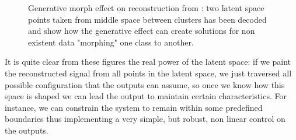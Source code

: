 \begin{figure}
    \centering
    \caption{Generative morph effect on reconstruction from : two latent space points taken from middle space between clusters has been decoded and show how the generative effect can create solutions for non existent data "morphing" one class to another. } 
    \label{fig:step1_morph}
\end{figure}
It is quite clear from these figures the real power of the latent space: if we paint the reconstructed signal from all points in the latent space, we just traversed all possible configuration that the outputs can assume, so once we know how this space is shaped we can lead the output to maintain certain characteristics. For instance, we can constrain the system to remain within some predefined boundaries thus implementing a very simple, but robust, non linear control on the outputs.

